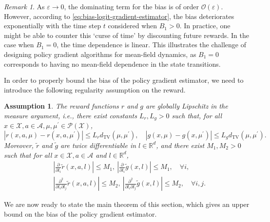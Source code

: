 \documentclass[11pt]{article}
\numberwithin{equation}{section}
\newtheorem{assumption}{Assumption}
\theoremstyle{definition}
\theoremstyle{remark}
\newtheorem{remark}{Remark}[section]
\def\eps{\varepsilon}
\def\tv{\mathrm{TV}}
\def\cA{\mathcal{A}}
\def\cP{\mathcal{P}}
\def\cX{\mathcal{X}}
\def\R{{\mathbb R}}
\begin{document}
\begin{remark}
\label{remark:bias-logit-estimation}
    As $\eps \to 0$, the dominating term for the bias is of order $\mathcal O (\eps)$. However, according to \eqref{eq:bias-logit-gradient-estimator}, the bias deteriorates exponentially with the time step $t$ considered when $B_1 > 0$. In practice, one might be able to counter this `curse of time' by discounting future rewards. In the case when $B_1 = 0$, the time dependence is linear. 
    This illustrates the challenge of designing policy gradient algorithms for mean-field dynamics, as $B_1=0$ corresponds to having no mean-field dependence in the state transitions.
\end{remark}

In order to properly bound the bias of the policy gradient estimator, we need to introduce the following regularity assumption on the reward.

\begin{assumption}
    \label{assumption:lipschitz-reward}
    The reward functions $r$ and $g$ are globally Lipschitz in the measure argument, i.e.,
    there exist constants $L_r, L_g > 0$ such that, for all $x \in \cX, a \in \cA, \mu, \mu^\prime \in \cP(\cX)$,
    \[
    | r(x,a,\mu) - r(x,a,\mu^\prime) | \leq L_r d_\tv (\mu, \mu^\prime), \quad | g(x,\mu) - g(x,\mu^\prime) | \leq L_g d_\tv (\mu, \mu^\prime).
    \]
    Moreover, $\tilde r$ and $\tilde g$ are twice differentiable in $l \in \R^d$, and there exist $M_1, M_2 > 0$ such that 
    for all $x \in \cX, a \in \cA$ and $l \in \R^d$,
    \[
    \begin{aligned}
        &\left| \frac{\partial}{\partial l_i} \tilde r(x,a,l) \right| \leq M_1, \: \left| \frac{\partial}{\partial l_i} \tilde g(x,l) \right| \leq M_1, \quad  \forall i, \\
        &\left| \frac{\partial ^2}{\partial l_i \partial l_j} \tilde r(x,a,l) \right| \leq M_2,\: \left|\frac{\partial ^2}{\partial l_i \partial l_j} \tilde g(x,l) \right| \leq M_2,   \quad  \forall i,j.
    \end{aligned}
    \]
\end{assumption}

We are now ready to state the main theorem of this section, which gives an upper bound on the bias
of the policy gradient estimator.
\end{document}
